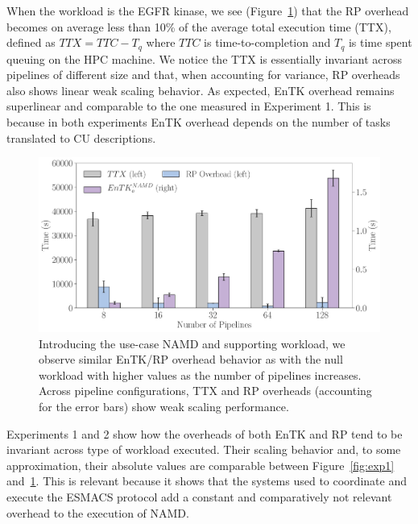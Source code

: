When the workload is the EGFR kinase, we see (Figure~\ref{fig:exp2}) that the RP
overhead becomes on average less than 10\% of the average total execution time
(TTX), defined as \(TTX = TTC - T_q\) where \(TTC\) is time-to-completion and
\(T_q\)%
is time spent queuing on the HPC machine. We notice the TTX is essentially
invariant 
across pipelines of different size and that, when accounting for variance, RP
overheads also shows linear weak scaling behavior. As expected, EnTK overhead
remains superlinear and comparable to the one measured in Experiment 1. This
is because in both experiments EnTK overhead depends on the number of tasks
translated to CU descriptions.

\begin{figure}
  \centering
  \includegraphics[width=\columnwidth]{FIGURES/namd_workload_overheads.pdf}
  \caption{Introducing the use-case NAMD and supporting workload, we observe
  similar EnTK/RP overhead behavior as with the null workload with higher
  values as the number of pipelines increases. Across pipeline
  configurations, TTX and RP overheads (accounting for the error bars) show %
  weak scaling performance.}\label{fig:exp2}
\end{figure}


Experiments 1 and 2 show how the overheads of both EnTK and RP tend to be
invariant across type of workload executed. Their scaling behavior and, to
some approximation, their absolute values are comparable between
Figure~\ref{fig:exp1} and~\ref{fig:exp2}. This is relevant because it shows
that the systems used to coordinate and execute the ESMACS protocol add a
constant and comparatively not relevant overhead to the execution of NAMD\@.

